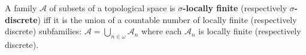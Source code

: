 A family $\mathcal{A}$ of subsets of a topological space is \textbf{$\sigma$-locally finite} (respectively \textbf{$\sigma$-discrete}) iff it is the union of a countable number of locally finite (respectively discrete) subfamilies: $\mathcal{A} = \bigcup_{n \in \omega} \mathcal{A}_n$ where each $\mathcal{A}_n$ is locally finite (respectively discrete).
